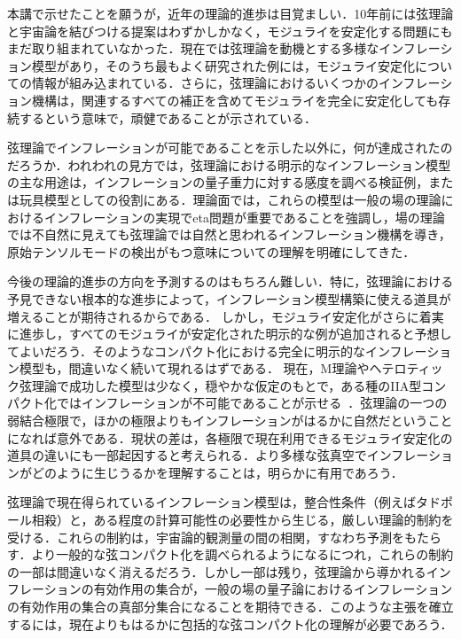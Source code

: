 
本講で示せたことを願うが，近年の理論的進歩は目覚ましい．10年前には弦理論と宇宙論を結びつける提案はわずかしかなく，モジュライを安定化する問題にもまだ取り組まれていなかった．現在では弦理論を動機とする多様なインフレーション模型があり，そのうち最もよく研究された例には，モジュライ安定化についての情報が組み込まれている．さらに，弦理論におけるいくつかのインフレーション機構は，関連するすべての補正を含めてモジュライを完全に安定化しても存続するという意味で，頑健であることが示されている．

弦理論でインフレーションが可能であることを示した以外に，何が達成されたのだろうか．われわれの見方では，弦理論における明示的なインフレーション模型の主な用途は，インフレーションの量子重力に対する感度を調べる検証例，または玩具模型としての役割にある．理論面では，これらの模型は一般の場の理論におけるインフレーションの実現でeta問題が重要であることを強調し，場の理論では不自然に見えても弦理論では自然と思われるインフレーション機構を導き，原始テンソルモードの検出がもつ意味についての理解を明確にしてきた．

今後の理論的進歩の方向を予測するのはもちろん難しい．特に，弦理論における予見できない根本的な進歩によって，インフレーション模型構築に使える道具が増えることが期待されるからである．
しかし，モジュライ安定化がさらに着実に進歩し，すべてのモジュライが安定化された明示的な例が追加されると予想してよいだろう．そのようなコンパクト化における完全に明示的なインフレーション模型も，間違いなく続いて現れるはずである．
現在，M理論やヘテロティック弦理論で成功した模型は少なく，穏やかな仮定のもとで，ある種のIIA型コンパクト化ではインフレーションが不可能であることが示せる~\cite{Hertzberg:2007wc, Flauger:2008ad, Caviezel:2008tf}．弦理論の一つの弱結合極限で，ほかの極限よりもインフレーションがはるかに自然だということになれば意外である．現状の差は，各極限で現在利用できるモジュライ安定化の道具の違いにも一部起因すると考えられる．より多様な弦真空でインフレーションがどのように生じうるかを理解することは，明らかに有用であろう．

弦理論で現在得られているインフレーション模型は，整合性条件（例えばタドポール相殺）と，ある程度の計算可能性の必要性から生じる，厳しい理論的制約を受ける．これらの制約は，宇宙論的観測量の間の相関，すなわち予測をもたらす．より一般的な弦コンパクト化を調べられるようになるにつれ，これらの制約の一部は間違いなく消えるだろう．しかし一部は残り，弦理論から導かれるインフレーションの有効作用の集合が，一般の場の量子論におけるインフレーションの有効作用の集合の真部分集合になることを期待できる．このような主張を確立するには，現在よりもはるかに包括的な弦コンパクト化の理解が必要であろう．



